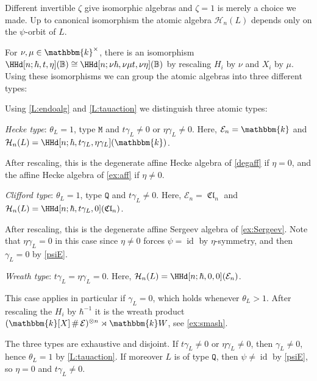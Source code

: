 \documentclass[a4paper,11pt]{amsart}
\numberwithin{equation}{subsection}
\theoremstyle{definition}
\theoremstyle{theorem}
\theoremstyle{remark}
\DeclareMathOperator\Cl{\mathfrak{Cl}}
\newcommand\Sym{W}
\newcommand\op{\operatorname}
\newcommand\kk{\mathbbm{k}}
\newcommand{\Bo}{\mathbb{B}}
\DeclareMathOperator\Smash{\#}
\begin{document}
\begin{Remark}Different invertible $\zeta$ give isomorphic algebras and
$\zeta=1$ is merely a choice we made.
Up to canonical isomorphism the atomic algebra $\mathcal H_n(L)$ depends only on the $\psi$-orbit of $L$.
\end{Remark}

For  $\nu,\mu\in\kk^\times$, there is an isomorphism $\HHd[n;\hbar,t,\eta](\Bo)\cong\HHd[n;\nu\hbar,\nu\mu t,\nu\eta](\Bo)$ by rescaling $H_i$ by $\nu$ and $X_i$ by $\mu$. Using these isomorphisms we can group the atomic algebras into three different types:

\begin{Definition}\label{R:blocks}
Using \autoref{L:endoalg} and \autoref{L:tauaction} we distinguish three atomic types:
  \begin{Enumerate}
    \item\label{Hecketype1} \emph{Hecke type}: $\theta_L=1$, type $\mathtt M$ and  $t\gamma_L\ne0$ or $\eta\gamma_L\ne0$. Here, $\mathcal E_n=\kk$ and
      $\mathcal H_n(L)=\HHd[n;\hbar,t\gamma_L,\eta\gamma_L](\kk)$.

      \noindent After rescaling, this is the degenerate affine Hecke algebra of \autoref{degaff} if $\eta=0$, and the affine Hecke algebra of \autoref{ex:aff} if $\eta\ne0$.
    \item\label{Hecketype2} \emph{Clifford type}:  $\theta_L=1$, type $\mathtt Q$ and $t\gamma_L\ne0$. Here,
      $\mathcal E_n=\Cl_n$ and
      $\mathcal H_n(L)=\HHd[n;\hbar,t\gamma_L,0](\Cl_n)$.

      \noindent After rescaling, this is the degenerate affine Sergeev algebra of \autoref{ex:Sergeev}. Note that $\eta\gamma_L=0$ in this case since $\eta\ne0$ forces $\psi=\op{id}$ by $\eta$-symmetry, and then  $\gamma_L=0$ by \autoref{psiE}.

    \item\label{wreathtype}  \emph{Wreath type}: $t\gamma_L=\eta\gamma_L=0$. Here,
      $\mathcal H_n(L)=\HHd[n;\hbar,0,0](\mathcal E_n)$.

    \noindent This case applies  in particular if $\gamma_L=0$, which holds whenever $\theta_L>1$.  After rescaling the $H_i$ by $\hbar^{-1}$ it is the wreath product $(\kk[X]\Smash\mathcal E)^{\otimes n}\rtimes\kk\Sym$, see
     \autoref{ex:smash}.
  \end{Enumerate}
  \end{Definition}

\begin{Remark}
  The three types are exhaustive and disjoint. If $t\gamma_L\not=0$ or $\eta\gamma_L\not=0$, then $\gamma_L\ne0$, hence $\theta_L=1$ by \autoref{L:tauaction}. If moreover $L$ is of type $\mathtt Q$, then $\psi\ne\op{id}$ by \autoref{psiE}, so $\eta=0$ and $t\gamma_L\ne0$.
\end{Remark}
\end{document}
